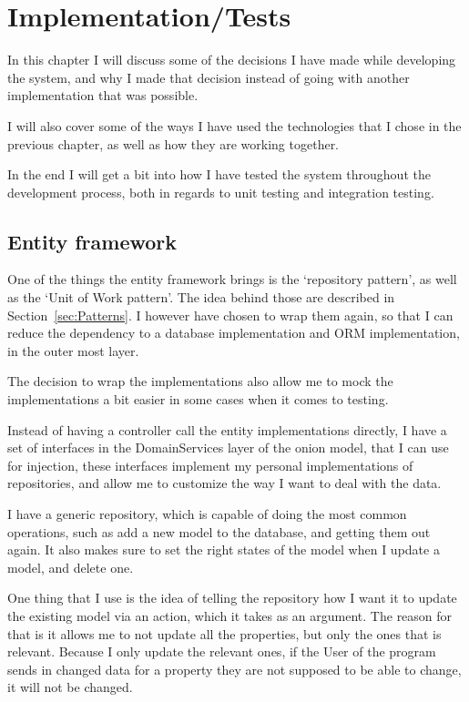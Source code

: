 \chapter{Implementation/Tests}
\label{chap:Implementation}

In this chapter I will discuss some of the decisions I have made while
developing the system, and why I made that decision instead of going with
another implementation that was possible.

I will also cover some of the ways I have used the technologies that I chose in
the previous chapter, as well as how they are working together.

In the end I will get a bit into how I have tested the system throughout the
development process, both in regards to unit testing and integration testing.

\section{Entity framework}
\label{sec:Entity framework}
One of the things the entity framework brings is the `repository pattern', as
well as the `Unit of Work pattern'. The idea behind those are described in
Section~\ref{sec:Patterns}. I however have chosen to wrap them again, so that I
can reduce the dependency to a database implementation and ORM implementation,
in the outer most layer. 

The decision to wrap the implementations also allow me to mock the
implementations a bit easier in some cases when it comes to testing. 

Instead of having a controller call the entity implementations directly, I have
a set of interfaces in the DomainServices layer of the onion model, that I can
use for injection, these interfaces implement my personal implementations of
repositories, and allow me to customize the way I want to deal with the data. 

I have a generic repository, which is capable of doing the most common
operations, such as add a new model to the database, and getting them out again.
It also makes sure to set the right states of the model when I update a model,
and delete one. 

One thing that I use is the idea of telling the repository how I want it to
update the existing model via an action, which it takes as an argument. The
reason for that is it allows me to not update all the properties, but only the
ones that is relevant. Because I only update the relevant ones, if the User of
the program sends in changed data for a property they are not supposed to be
able to change, it will not be changed. 

